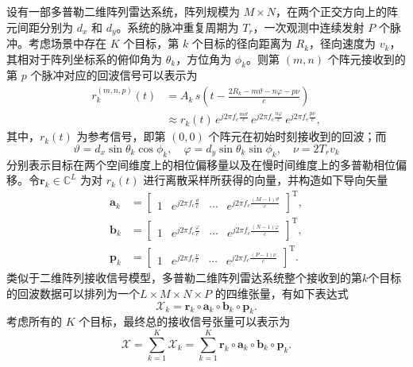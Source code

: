设有一部多普勒二维阵列雷达系统，阵列规模为 \(M \times N\)，在两个正交方向上的阵元间距分别为 \(d_x\) 和 \(d_y\)。系统的脉冲重复周期为 \(T_r\)，一次观测中连续发射 \(P\) 个脉冲。考虑场景中存在 \(K\) 个目标，第 \(k\) 个目标的径向距离为 \(R_k\)，径向速度为 \(v_k\)，其相对于阵列坐标系的俯仰角为 \(\theta_k\)，方位角为 \(\phi_k\)。则第 \((m,n)\) 个阵元接收到的第 \(p\) 个脉冲对应的回波信号可以表示为
\[
    \begin{split}
        r^{(m,n,p)}_k(t)
         & = A_k\, s\left(t - \frac{2 R_k - m\vartheta - n\varphi - p\nu}{c}\right) \\
         & \approx r_k(t)\,
        e^{j 2 \pi f_c \tfrac{m \vartheta}{c}}\,
        e^{j 2 \pi f_c \tfrac{n \varphi}{c}}\,
        e^{j 2 \pi f_c \tfrac{p \nu}{c}},
    \end{split}
\]
其中，\(r_k(t)\) 为参考信号，即第 \((0,0)\) 个阵元在初始时刻接收到的回波；而
\[
    \vartheta = d_x \sin\theta_k \cos\phi_k,
    \quad
    \varphi = d_y \sin\theta_k \sin\phi_k,
    \quad
    \nu = 2 T_r v_k
\]
分别表示目标在两个空间维度上的相位偏移量以及在慢时间维度上的多普勒相位偏移。令\( \bm{r}_k \in \mathbb{C}^{L} \) 为对 \(r_k(t)\) 进行离散采样所获得的向量，并构造如下导向矢量
\[
    \begin{split}
        \bm{a}_k & = \begin{bmatrix}
                         1 & e^{j 2 \pi f_c \frac{\vartheta}{c}} & \cdots & e^{j 2 \pi f_c \frac{(M-1) \vartheta}{c}}
                     \end{bmatrix}^{\mathrm{T}}, \\
        \bm{b}_k & = \begin{bmatrix}
                         1 & e^{j 2 \pi f_c \frac{\varphi}{c}} & \cdots & e^{j 2 \pi f_c \frac{(N-1) \varphi}{c}}
                     \end{bmatrix}^{\mathrm{T}}, \\
        \bm{p}_k & = \begin{bmatrix}
                         1 & e^{j 2 \pi f_c \frac{\nu}{c}} & \cdots & e^{j 2 \pi f_c \frac{(P-1) \nu}{c}}
                     \end{bmatrix}^{\mathrm{T}}.
    \end{split}
\]
类似于二维阵列接收信号模型，多普勒二维阵列雷达系统整个接收到的第\( k \)个目标的回波数据可以排列为一个\( L \times M \times N \times P \) 的四维张量，有如下表达式
\[
    \mathcal{X}_k = \bm{r}_k \circ \bm{a}_k \circ \bm{b}_k \circ \bm{p}_k.
\]
考虑所有的 \(K\) 个目标，最终总的接收信号张量可以表示为
\[
    \mathcal{X} = \sum_{k=1}^{K} \mathcal{X}_k = \sum_{k=1}^{K} \bm{r}_k \circ \bm{a}_k \circ \bm{b}_k \circ \bm{p}_k.
\]

